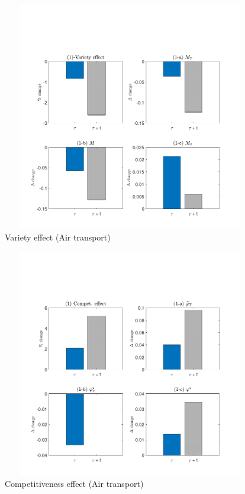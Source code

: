 \documentclass[a4paper,11pt]{article}
\begin{document}
\begin{figure}[htbp]
\caption{Variety effect (Air transport)}
\label{fig:variety_air_decomp}
\includegraphics[width=12cm, height=10cm]{VarietyEffect_air.pdf}
\end{figure}


\begin{figure}[htbp]
\caption{Competitiveness effect (Air transport)}
\label{fig:competitivity_air_decomp}
\includegraphics[width=12cm, height=10cm]{CompetEffect_air.pdf}
\end{figure}
\end{document}
